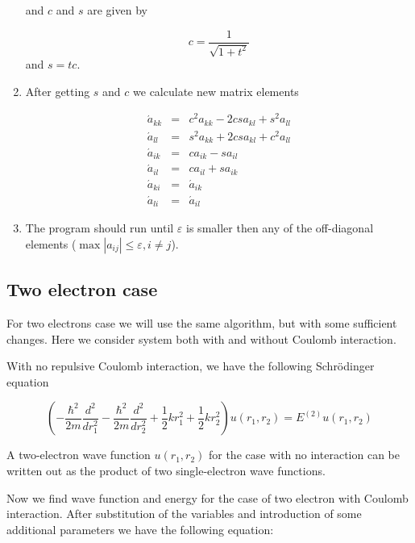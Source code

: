 \documentclass[10pt]{article}
\begin{document}
\begin{enumerate}
and $c$ and $s$ are given by

\begin{equation}
c=\frac{1}{\sqrt{1+t^{2}}}
\end{equation}
and $s=tc$. 

\item 
After getting $s$ and $c$ we calculate new matrix elements



\begin{eqnarray*}
\acute{a}_{kk} &=&c^{2}a_{kk}-2csa_{kl}+s^{2}a_{ll} \\
\acute{a}_{ll} &=&s^{2}a_{kk}+2csa_{kl}+c^{2}a_{ll} \\
\acute{a}_{ik} &=&ca_{ik}-sa_{il} \\
\acute{a}_{il} &=&ca_{il}+sa_{ik} \\
\acute{a}_{ki} &=&\acute{a}_{ik} \\
\acute{a}_{li} &=&\acute{a}_{il}
\end{eqnarray*}

\item 
The program should run until $\varepsilon $ is smaller then any of the off-diagonal elements ($\max \left\vert a_{ij}\right\vert \leq
\varepsilon ,i\neq j$).
\end{enumerate}

\subsection{Two electron case}
For two electrons case  we will use the same algorithm, but with some
sufficient changes. Here we consider system both with and without Coulomb interaction.

With no repulsive Coulomb interaction, we have the following Schr\"{o}dinger
equation

\begin{equation}
	\left( -\frac{\hbar ^{2}}{2m}\frac{d^{2}}{dr_{1}^{2}}-\frac{\hbar ^{2}}{2m}%
	\frac{d^{2}}{dr_{2}^{2}}+\frac{1}{2}kr_{1}^{2}+\frac{1}{2}kr_{2}^{2}\right)
	u(r_{1},r_{2})=E^{(2)}u(r_{1},r_{2})
\end{equation}


	A two-electron wave function $u(r_{1},r_{2})$ for the case with no
	interaction can be written out as the product of two single-electron wave
	functions.
	
	Now we find wave function and energy for the case of two electron
	with Coulomb interaction. After substitution of the variables and
	introduction of some additional parameters we have the following equation:
	
\end{document}
